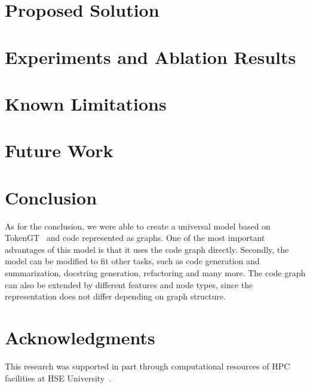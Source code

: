 \documentclass[conference]{IEEEtran}
\begin{document}
\section{Proposed Solution}\label{sec:proposed-solution}


\section{Experiments and Ablation Results}\label{sec:experiment-results-and-ablation}


\section{Known Limitations}\label{sec:known-limitations}


\section{Future Work}\label{sec:future-work}


\section{Conclusion}\label{sec:conclusion}

As for the conclusion, we were able to create a universal model based on TokenGT~\cite{kim_pure_2022} and code represented as graphs.
One of the most important advantages of this model is that it uses the code graph directly.
Secondly, the model can be modified to fit other tasks, such as code generation and summarization, docstring generation, refactoring and many more.
The code graph can also be extended by different features and node types, since the representation does not differ depending on graph structure.

\section{Acknowledgments}\label{sec:acknowledgments}

This research was supported in part through computational resources of HPC facilities at HSE University~\cite{kostenetskiy_hpc_2021}.

\printbibliography
\end{document}

